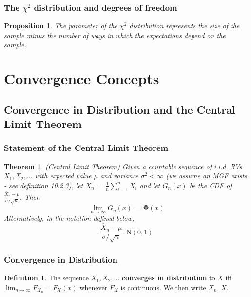 \documentclass[12pt]{article}
\newtheorem{thm}{Theorem}[section]
\newtheorem*{prop*}{Proposition}
\theoremstyle{definition}
\newtheorem{defn}{Definition}[subsection]
\newcommand{\stdnorm}{\mathbf{\Phi}}
\DeclareMathOperator{\distto}{\xrightarrow{\mathcal{D}}}
\begin{document}
\subsubsection{The $\chi^2$ distribution and degrees of freedom}

\begin{prop*}
  The parameter of the $\chi^2$ distribution represents the size of the sample minus the number of ways in which the expectations depend on the sample.
\end{prop*}

\section{Convergence Concepts}

\subsection{Convergence in Distribution and the Central Limit Theorem}

\subsubsection{Statement of the Central Limit Theorem}


\begin{thm}
  (Central Limit Theorem)
  Given a countable sequence of i.i.d. RVs $X_1, X_2, \ldots$ with expected value $\mu$ and variance $\sigma^2 < \infty$ (we assume an MGF exists - see definition 10.2.3), let $\overline{X}_n := \frac{1}{n}\sum_{i = 1}^nX_i$ and let $G_n(x)$ be the CDF of $\frac{\overline{X}_n - \mu}{\sigma / \sqrt{n}}$. 
  Then
  $$\lim_{n \to \infty}G_n(x) := \stdnorm(x)$$
  Alternatively, in the notation defined below,
  $$\frac{\overline{X}_n - \mu}{\sigma / \sqrt{n}} \distto \text{N}(0, 1)$$
\end{thm}


\subsubsection{Convergence in Distribution}

\begin{defn}
  The sequence $X_1, X_2, \ldots$ \textbf{converges in distribution} to $X$ iff\\ $\lim_{n \to \infty}F_{X_n} = F_X(x)$ whenever $F_X$ is continuous.
  We then write $X_n \distto X$.
\end{defn}
\end{document}
